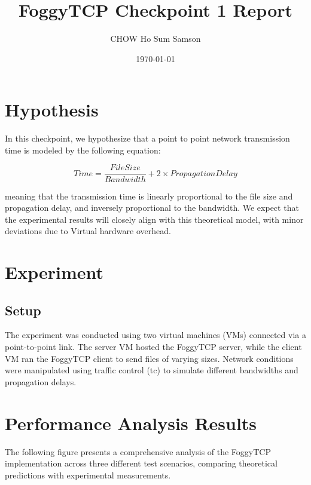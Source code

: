 \documentclass[11pt,letterpaper]{article}
\title{FoggyTCP Checkpoint 1 Report}
\author{CHOW Ho Sum Samson}
\date{\today}
\begin{document}
\maketitle

\section{Hypothesis}

In this checkpoint, we hypothesize that a point to point 
network transmission time is modeled by the following equation:

\begin{equation}
    Time = \frac{File Size}{Bandwidth} + 2 \times Propagation Delay
\end{equation}

meaning that the transmission time is linearly proportional to the file size and propagation delay,
 and inversely proportional to the bandwidth.
  We expect that the experimental results will closely align with this theoretical model,
   with minor deviations due to Virtual hardware overhead.

\section{Experiment}    
\subsection{Setup}
The experiment was conducted using two virtual machines (VMs) connected via a point-to-point link.
 The server VM hosted the FoggyTCP server, while the client VM ran the FoggyTCP client to send files of varying sizes.
  Network conditions were manipulated using traffic control (tc) to simulate different bandwidths and propagation delays.

\section{Performance Analysis Results}

The following figure presents a comprehensive analysis of the FoggyTCP implementation across three different test scenarios, comparing theoretical predictions with experimental measurements.
\end{document}
